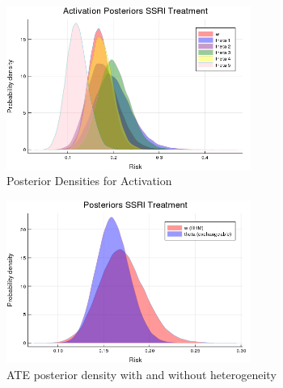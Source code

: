 \documentclass{juliacon}
\begin{document}
\begin{figure}[t]
	\centerline{\includegraphics[width=8cm]{activation_posteriors.png}}
	\caption{Posterior Densities for Activation}
	\label{fig:activ}
\end{figure}

\begin{figure}[t]
	\centerline{\includegraphics[width=8cm]{bhm_vs_non_compare.png}}
	\caption{ATE posterior density with and without heterogeneity}
	\label{fig:compare}
\end{figure}
 
\end{document}
